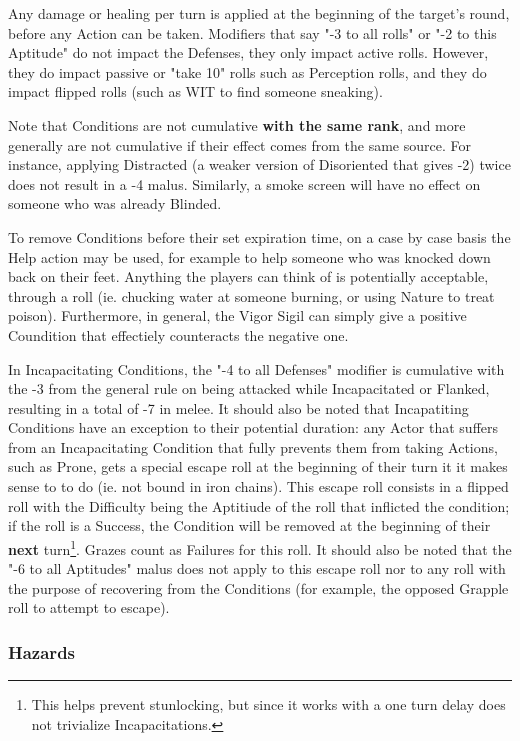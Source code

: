 Any damage or healing per turn is applied at the beginning of the target's round, before any Action can be taken. Modifiers that say "-3 to all rolls" or "-2 to this Aptitude" do not impact the Defenses, they only impact active rolls. However, they do impact passive or "take 10" rolls such as Perception rolls, and they do impact flipped rolls (such as WIT to find someone sneaking).

Note that Conditions are not cumulative \textbf{with the same rank}, and more generally are not cumulative if their effect comes from the same source. For instance, applying Distracted (a weaker version of Disoriented that gives -2) twice does not result in a -4 malus. Similarly, a smoke screen will have no effect on someone who was already Blinded.

To remove Conditions before their set expiration time, on a case by case basis the Help action may be used, for example to help someone who was knocked down back on their feet. Anything the players can think of is potentially acceptable, through a roll (ie. chucking water at someone burning, or using Nature to treat poison). Furthermore, in general, the Vigor Sigil can simply give a positive Coundition that effectiely counteracts the negative one.

In Incapacitating Conditions, the "-4 to all Defenses" modifier is cumulative with the -3 from the general rule on being attacked while Incapacitated or Flanked, resulting in a total of -7 in melee. It should also be noted that Incapatiting Conditions have an exception to their potential duration: any Actor that suffers from an Incapacitating Condition that fully prevents them from taking Actions, such as Prone, gets a special escape roll at the beginning of their turn it it makes sense to to do (ie. not bound in iron chains). This escape roll consists in a flipped roll with the Difficulty being the Aptitiude of the roll that inflicted the condition; if the roll is a Success, the Condition will be removed at the beginning of their \textbf{next} turn\footnote{This helps prevent stunlocking, but since it works with a one turn delay does not trivialize Incapacitations.}. Grazes count as Failures for this roll. It should also be noted that the "-6 to all Aptitudes" malus does not apply to this escape roll nor to any roll with the purpose of recovering from the Conditions (for example, the opposed Grapple roll to attempt to escape).


\subsubsection{Hazards}

